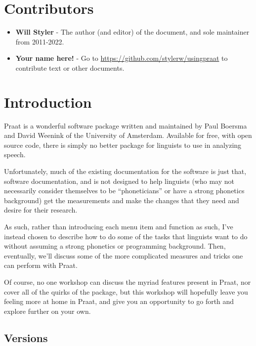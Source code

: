 \hypertarget{contributors}{%
\section{Contributors}\label{contributors}}

\begin{itemize}
\tightlist
\item
  \textbf{Will Styler} - The author (and editor) of the document, and
  sole maintainer from 2011-2022.
\item
  \textbf{Your name here!} - Go to
  \url{https://github.com/stylerw/usingpraat} to contribute text or
  other documents.
\end{itemize}

\pagebreak

\hypertarget{introduction}{%
\section{Introduction}\label{introduction}}

Praat is a wonderful software package written and maintained by Paul
Boersma and David Weenink of the University of Amsterdam. Available for
free, with open source code, there is simply no better package for
linguists to use in analyzing speech.

Unfortunately, much of the existing documentation for the software is
just that, software documentation, and is not designed to help linguists
(who may not necessarily consider themselves to be ``phoneticians'' or
have a strong phonetics background) get the measurements and make the
changes that they need and desire for their research.

As such, rather than introducing each menu item and function as such,
I've instead chosen to describe how to do some of the tasks that
linguists want to do without assuming a strong phonetics or programming
background. Then, eventually, we'll discuss some of the more complicated
measures and tricks one can perform with Praat.

Of course, no one workshop can discuss the myriad features present in
Praat, nor cover all of the quirks of the package, but this workshop
will hopefully leave you feeling more at home in Praat, and give you an
opportunity to go forth and explore further on your own.

\hypertarget{versions}{%
\subsection{Versions}\label{versions}}

